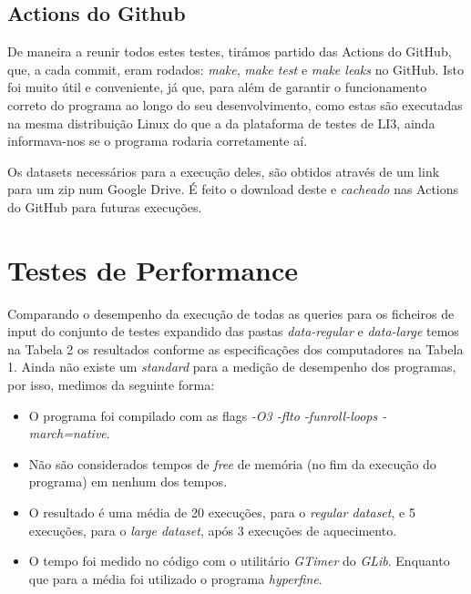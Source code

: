 \documentclass{article}
\begin{document}
        \subsection{Actions do Github}
            De maneira a reunir todos estes testes, tirámos partido das Actions do GitHub, que, a cada
            commit, eram rodados: \textit{make}, \textit{make test} e \textit{make leaks} no GitHub. Isto foi muito útil
            e conveniente, já que, para além de garantir o funcionamento correto do programa ao longo do seu desenvolvimento,
            como estas são executadas na mesma distribuição Linux do que a da plataforma de testes de LI3,
            ainda informava-nos se o programa rodaria corretamente aí.
            
            Os datasets necessários para a execução deles, são obtidos através de um link para um zip num
            Google Drive. É feito o download deste e \textit{cacheado} nas Actions do GitHub para futuras
            execuções.
            
    \newpage     
    \section{Testes de Performance}
            Comparando o desempenho da execução de todas as queries para 
            os ficheiros de input do conjunto de testes expandido das pastas 
            \emph{data-regular} e \emph{data-large} temos na Tabela 2 os resultados 
            conforme as especificações dos computadores na Tabela 1. Ainda não existe um
            \emph{standard} para a medição de desempenho dos programas, por isso,
            medimos da seguinte forma:

            \begin{itemize}
                \item O programa foi compilado com as flags \emph{-O3 -flto -funroll-loops -march=native}.
                \item Não são considerados tempos de \emph{free} de memória (no fim da execução
                do programa) em nenhum dos tempos.
                \item O resultado é uma média de 20 execuções, para o \emph{regular dataset}, e 5 execuções, 
                para o \emph{large dataset}, após 3 execuções de aquecimento. 
                \item O tempo foi medido no código com o utilitário \emph{GTimer} do \emph{GLib}. Enquanto 
                que para a média foi utilizado o programa \emph{hyperfine}.
            \end{itemize}
            
\end{document}
